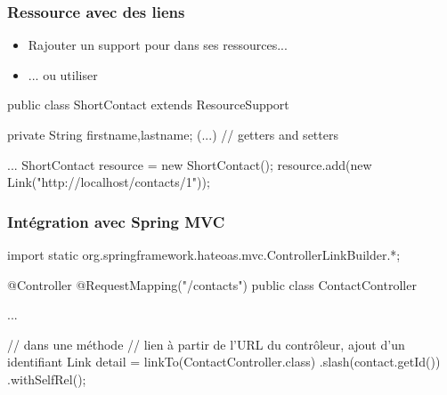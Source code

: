 \begin{frame}[fragile]
 \frametitle{Ressource avec des liens}
 
 \begin{itemize}
  \item Rajouter un support pour  dans ses ressources...
  \item ... ou utiliser 
 \end{itemize}
 
 \begin{javacode}
public class ShortContact extends ResourceSupport {

  private String firstname,lastname;
  (...) // getters and setters
}
...
ShortContact resource = new ShortContact();
resource.add(new Link("http://localhost/contacts/1"));
 \end{javacode}

\end{frame}

\begin{frame}[fragile]
 \frametitle{Intégration avec Spring MVC}

 \begin{javacode}
import static org.springframework.hateoas.mvc.ControllerLinkBuilder.*;

@Controller
@RequestMapping("/contacts")
public class ContactController { 
  ...
  
  // dans une m\'ethode
  // lien \`a partir de l'URL du contr\^oleur, ajout d'un identifiant
  Link detail = linkTo(ContactController.class)
    .slash(contact.getId())
    .withSelfRel();

}
 \end{javacode}

\end{frame} 